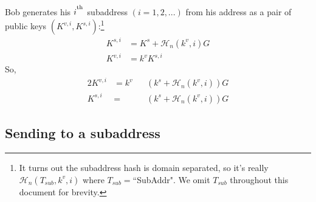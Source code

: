 Bob generates his $i^\textsuperscript{th}$ subaddress $(i = 1, 2, ...)$ from his address as a pair of public keys $(K^{v,i}, K^{s,i})$:\footnote{It turns out the subaddress hash is domain separated, so it's really $\mathcal{H}_n(T_{sub},k^v,i)$ where $T_{sub} = $``SubAddr". We omit $T_{sub}$ throughout this document for brevity.}\vspace{.175cm}
\begin{align*}
    K^{s,i} &= K^s + \mathcal{H}_n(k^v, i) G\\
    K^{v,i} &= k^v K^{s,i}
\end{align*}
\quad So,
\begin{alignat*}{2}
    K^{v,i} &= k^v&&(k^s + \mathcal{H}_n(k^v, i))G\\
    K^{s,i} &= &&(k^s + \mathcal{H}_n(k^v, i))G
\end{alignat*}
    

\subsection{Sending to a subaddress}
    
